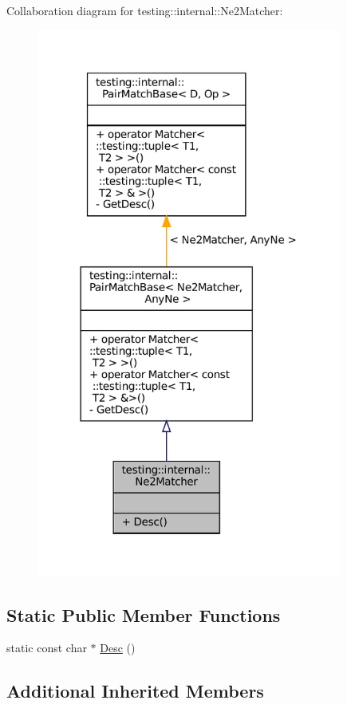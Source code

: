 Collaboration diagram for testing\+:\+:internal\+:\+:Ne2\+Matcher\+:
\nopagebreak
\begin{figure}[H]
\begin{center}
\leavevmode
\includegraphics[width=284pt]{classtesting_1_1internal_1_1Ne2Matcher__coll__graph}
\end{center}
\end{figure}
\subsection*{Static Public Member Functions}
\begin{DoxyCompactItemize}
\item 
static const char $\ast$ \hyperlink{classtesting_1_1internal_1_1Ne2Matcher_a4a387f6ef1d20caf53911ef91c0f39f1}{Desc} ()
\end{DoxyCompactItemize}
\subsection*{Additional Inherited Members}


